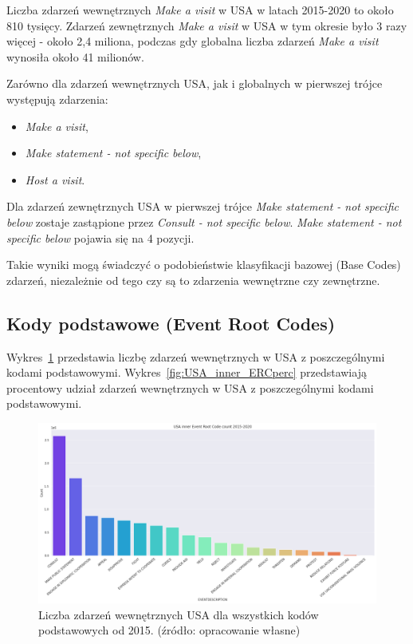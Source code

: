 \documentclass[11pt]{report}
\begin{document}
    Liczba zdarzeń wewnętrznych \textit{Make a visit} w USA w latach 2015-2020 to około 810 tysięcy.
    Zdarzeń zewnętrznych \textit{Make a visit} w USA w tym okresie było 3 razy więcej - około 2,4 miliona,
    podczas gdy globalna liczba zdarzeń \textit{Make a visit} wynosiła około 41 milionów.

    Zarówno dla zdarzeń wewnętrznych USA, jak i globalnych w pierwszej trójce występują zdarzenia:
    \begin{itemize}
        \item \textit{Make a visit},
        \item \textit{Make statement - not specific below},
        \item \textit{Host a visit}.
    \end{itemize}
    Dla zdarzeń zewnętrznych USA w pierwszej trójce \textit{Make statement - not specific below} zostaje zastąpione przez \textit{Consult - not specific below}.
    \textit{Make statement - not specific below} pojawia się na 4 pozycji.

    Takie wyniki mogą świadczyć o podobieństwie klasyfikacji bazowej (Base Codes) zdarzeń,
    niezależnie od tego czy są to zdarzenia wewnętrzne czy zewnętrzne.

    \subsection{Kody podstawowe (Event Root Codes)}

    Wykres~\ref{fig:USA_inner_ERC} przedstawia liczbę zdarzeń wewnętrznych w USA z poszczególnymi kodami podstawowymi.
    Wykres~\ref{fig:USA_inner_ERCperc} przedstawiają procentowy udział zdarzeń wewnętrznych w USA z poszczególnymi kodami podstawowymi.


    \begin{figure}[!htp]
        \centering
        \includegraphics[width=\linewidth]{fig/USA inner/ERC.png}
        \caption{Liczba zdarzeń wewnętrznych USA dla wszystkich kodów podstawowych od 2015. (źródło: opracowanie własne)}
        \label{fig:USA_inner_ERC}
    \end{figure}
\end{document}
